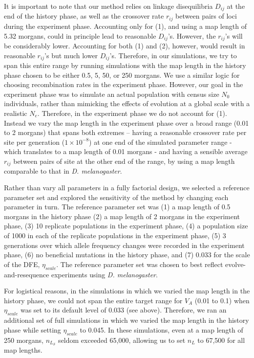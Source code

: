 \documentclass[12pt]{article}
\begin{document}
\begin{bibunit}
It is important to note that our method relies on linkage disequilibria $D_{ij}$ at the end of the history phase, as well as the crossover rate $r_{ij}$ between pairs of loci during the experiment phase. Accounting only for (1), and using a map length of 5.32 morgans, could in principle lead to reasonable $D_{ij}$'s. However, the $r_{ij}$'s will be considerably lower.  Accounting for both (1) and (2), however, would result in reasonable $r_{ij}$'s but much lower $D_{ij}$'s. Therefore, in our simulations, we try to span this entire range by running simulations with the map length in the history phase chosen to be either 0.5, 5, 50, or 250 morgans. We use a similar logic for choosing recombination rates in the experiment phase. However, our goal in the experiment phase was to simulate an actual population with census size $N_0$ individuals, rather than mimicking the effects of evolution at a global scale with a realistic $N_e$. Therefore, in the experiment phase we do not account for (1). Instead we vary the map length in the experiment phase over a broad range  (0.01 to 2 morgans) that spans both extremes -- having a reasonable crossover rate per site per generation ($1 \times 10^{-8}$) at one end of the simulated parameter range - which translates to a map length of 0.01 morgans - and having a sensible average $r_{ij}$ between pairs of site at the other end of the range, by using a map length comparable to that in \emph{D. melanogaster}.

Rather than vary all parameters in a fully factorial design, we selected a reference parameter set and explored the sensitivity of the method by changing each parameter in turn. The reference parameter set was (1) a map length of 0.5 morgans in the history phase (2) a map length of 2 morgans in the experiment phase, (3) 10 replicate populations in the experiment phase, (4) a population size of 1000 in each of the replicate populations in the experiment phase, (5) 3 generations over which allele frequency changes were recorded in the experiment phase, (6) no beneficial mutations in the history phase, and (7) 0.033 for the scale of the DFE, $\eta_{scale}$. The reference parameter set was chosen to best reflect evolve-and-resequence experiments using \emph{D. melanogaster}. 

For logistical reasons, in the simulations in which we varied the map length in the history phase, we could not span the entire target range for $V_A$ (0.01 to 0.1) when $\eta_{scale}$ was set to its default level of 0.033 (see above). Therefore, we ran an additional set of full simulations in which we varied the map length in the history phase while setting $\eta_{scale}$ to 0.045. In these simulations, even at a map length of 250 morgans, $n_{L_\mathcal{S}}$ seldom exceeded 65,000, allowing us to set $n_L$ to 67,500 for all map lengths.


\end{bibunit}
\end{document}
